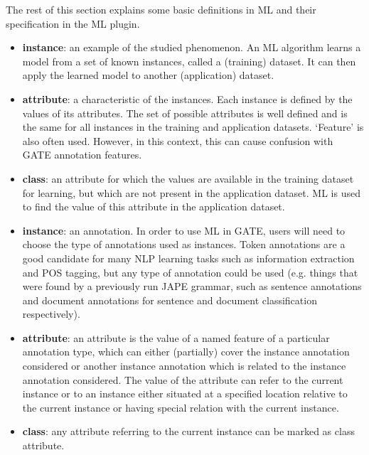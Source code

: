 The rest of this section explains some basic definitions in ML and
their specification in the ML plugin.


\begin{itemize}
  
\item \textbf{instance}: an example of the studied phenomenon. An ML
algorithm learns a model from a set of known instances, called a
(training) dataset. It can then apply the learned model to another
(application) dataset.

\item \textbf{attribute}: a characteristic of the instances. Each instance is
defined by the values of its attributes. The set of possible attributes is well
defined and is the same for all instances in the training and application
datasets. `Feature' is also often used. However, in this context, this can
cause confusion with GATE annotation features.

\item \textbf{class}: an attribute for which the values are available in the
  training dataset for learning, but which are not present in the application
  dataset. ML is used to find the value of this attribute in the application
  dataset.

\end{itemize}


\begin{itemize}

\item \textbf{instance}: an annotation. In order to use ML in GATE, users will
need to choose the type of annotations used as instances. Token annotations are a
good candidate for many NLP learning tasks such as information extraction and POS
tagging, but any type of annotation could be used (e.g. things that were found by
a previously run JAPE grammar, such as sentence annotations and document
annotations for sentence and document classification respectively).

\item \textbf{attribute}: an attribute is the value of a named feature of a
particular annotation type, which can either (partially) cover the instance
annotation considered or another instance annotation which is related to the
instance annotation considered.  The value of the attribute can refer to the
current instance or to an instance either situated at a specified location
relative to the current instance or having special relation with the current
instance.

\item \textbf{class}: any attribute referring to the current instance can be
marked as class attribute.

\end{itemize}

